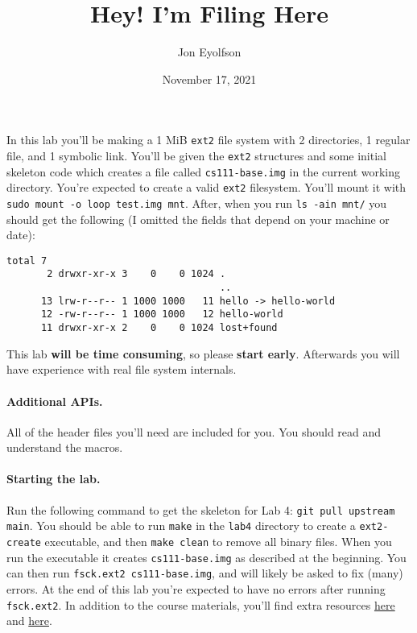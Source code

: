 

\title{Hey! I'm Filing Here}
\author{Jon Eyolfson}
\date{November 17, 2021}



\maketitle

In this lab you'll be making a 1 MiB \texttt{ext2} file system with 2
directories, 1 regular file, and 1 symbolic link.
You'll be given the \texttt{ext2} structures and some initial skeleton code
which creates a file called \texttt{cs111-base.img} in the current working
directory.
You're expected to create a valid \texttt{ext2} filesystem.
You'll mount it with \texttt{sudo mount -o loop test.img mnt}.
After, when you run \texttt{ls -ain mnt/} you should get the following
(I omitted the fields that depend on your machine or date):

\begin{lstlisting}
total 7
       2 drwxr-xr-x 3    0    0 1024 .
                                     ..
      13 lrw-r--r-- 1 1000 1000   11 hello -> hello-world
      12 -rw-r--r-- 1 1000 1000   12 hello-world
      11 drwxr-xr-x 2    0    0 1024 lost+found
\end{lstlisting}

This lab \textbf{will be time consuming}, so please \textbf{start early}.
Afterwards you will have experience with real file system internals.

\paragraph{Additional APIs.}

All of the header files you'll need are included for you.
You should read and understand the macros.

\paragraph{Starting the lab.}

Run the following command to get the skeleton for Lab 4:
\texttt{git pull upstream main}.
You should be able to run \texttt{make} in the \texttt{lab4} directory to
create a \texttt{ext2-create} executable, and then \texttt{make clean}
to remove all binary files.
When you run the executable it creates \texttt{cs111-base.img} as described
at the beginning.
You can then run \lstinline|fsck.ext2 cs111-base.img|, and will likely be
asked to fix (many) errors.
At the end of this lab you're expected to have no errors after running
\lstinline|fsck.ext2|.
In addition to the course materials, you'll find extra resources
\href{http://www.nongnu.org/ext2-doc/ext2.html}{here} and
\href{http://www.science.smith.edu/~nhowe/262/oldlabs/ext2.html}{here}.

